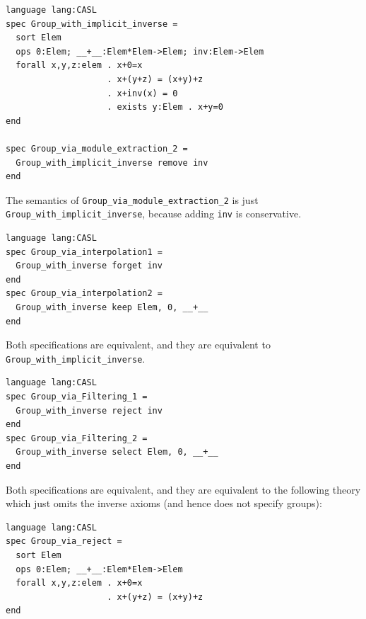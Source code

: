 \documentclass[10pt, a4paper]{isov2}
\newcommand*{\syntax}[1]{\texttt{#1}}
\begin{document}
\begin{lstlisting}[basicstyle=\ttfamily,language=dolText,alsolanguage=CASL,escapechar=@,mathescape]
language lang:CASL
spec Group_with_implicit_inverse =
  sort Elem
  ops 0:Elem; __+__:Elem*Elem->Elem; inv:Elem->Elem
  forall x,y,z:elem . x+0=x
                    . x+(y+z) = (x+y)+z
                    . x+inv(x) = 0
                    . exists y:Elem . x+y=0
end

spec Group_via_module_extraction_2 =
  Group_with_implicit_inverse remove inv
end
\end{lstlisting}
The semantics of \syntax{Group\_via\_module\_extraction\_2} is just
\syntax{Group\_with\_implicit\_inverse}, because adding \texttt{inv}
is conservative.
\medskip



\begin{lstlisting}[basicstyle=\ttfamily,language=dolText,alsolanguage=CASL,escapechar=@,mathescape]
language lang:CASL
spec Group_via_interpolation1 =
  Group_with_inverse forget inv
end
spec Group_via_interpolation2 =
  Group_with_inverse keep Elem, 0, __+__
end
\end{lstlisting}
Both specifications are equivalent, and they 
are equivalent to \syntax{Group\_with\_implicit\_inverse}.
\medskip


\label{ex:reject}
\begin{lstlisting}[basicstyle=\ttfamily,language=dolText,alsolanguage=CASL,escapechar=@,mathescape]
language lang:CASL
spec Group_via_Filtering_1 =
  Group_with_inverse reject inv
end
spec Group_via_Filtering_2 =
  Group_with_inverse select Elem, 0, __+__
end
\end{lstlisting}
Both specifications are equivalent, and they are equivalent 
to the following theory which just omits the inverse
axioms (and hence does not specify groups):
\begin{lstlisting}[basicstyle=\ttfamily,language=dolText,alsolanguage=CASL,escapechar=@,mathescape]
language lang:CASL
spec Group_via_reject =
  sort Elem
  ops 0:Elem; __+__:Elem*Elem->Elem
  forall x,y,z:elem . x+0=x
                    . x+(y+z) = (x+y)+z
end
\end{lstlisting}
\end{document}
